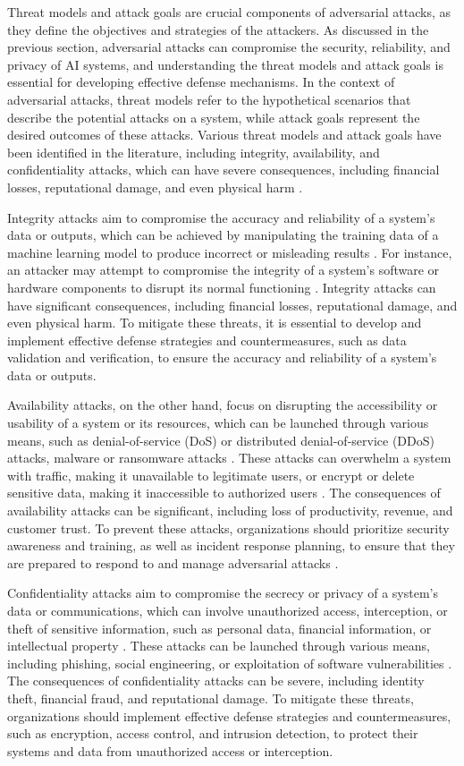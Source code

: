\documentclass[11pt]{article}
\begin{document}
Threat models and attack goals are crucial components of adversarial attacks, as they define the objectives and strategies of the attackers. As discussed in the previous section, adversarial attacks can compromise the security, reliability, and privacy of AI systems, and understanding the threat models and attack goals is essential for developing effective defense mechanisms. In the context of adversarial attacks, threat models refer to the hypothetical scenarios that describe the potential attacks on a system, while attack goals represent the desired outcomes of these attacks. Various threat models and attack goals have been identified in the literature, including integrity, availability, and confidentiality attacks, which can have severe consequences, including financial losses, reputational damage, and even physical harm \cite{ref39}.

Integrity attacks aim to compromise the accuracy and reliability of a system's data or outputs, which can be achieved by manipulating the training data of a machine learning model to produce incorrect or misleading results \cite{ref39}. For instance, an attacker may attempt to compromise the integrity of a system's software or hardware components to disrupt its normal functioning \cite{ref40}. Integrity attacks can have significant consequences, including financial losses, reputational damage, and even physical harm. To mitigate these threats, it is essential to develop and implement effective defense strategies and countermeasures, such as data validation and verification, to ensure the accuracy and reliability of a system's data or outputs.

Availability attacks, on the other hand, focus on disrupting the accessibility or usability of a system or its resources, which can be launched through various means, such as denial-of-service (DoS) or distributed denial-of-service (DDoS) attacks, malware or ransomware attacks \cite{ref41}. These attacks can overwhelm a system with traffic, making it unavailable to legitimate users, or encrypt or delete sensitive data, making it inaccessible to authorized users \cite{ref42}. The consequences of availability attacks can be significant, including loss of productivity, revenue, and customer trust. To prevent these attacks, organizations should prioritize security awareness and training, as well as incident response planning, to ensure that they are prepared to respond to and manage adversarial attacks \cite{ref43}.

Confidentiality attacks aim to compromise the secrecy or privacy of a system's data or communications, which can involve unauthorized access, interception, or theft of sensitive information, such as personal data, financial information, or intellectual property \cite{ref44}. These attacks can be launched through various means, including phishing, social engineering, or exploitation of software vulnerabilities \cite{ref45}. The consequences of confidentiality attacks can be severe, including identity theft, financial fraud, and reputational damage. To mitigate these threats, organizations should implement effective defense strategies and countermeasures, such as encryption, access control, and intrusion detection, to protect their systems and data from unauthorized access or interception.
\end{document}
